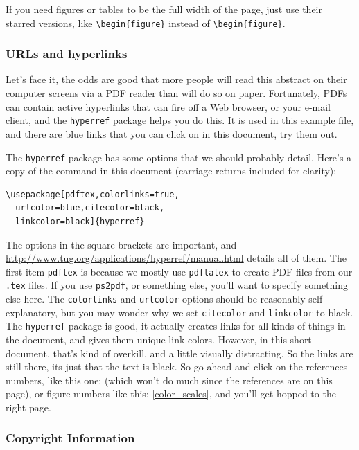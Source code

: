 \documentclass[twoside]{article}
\begin{document}
If you need figures or tables to be the full width of the page,
just use their starred versions, like \verb=\begin{figure}= instead
of \verb=\begin{figure}=.

\subsubsection*{URLs and hyperlinks}

Let's face it, the odds are good that more people will read this
abstract on their computer screens via a PDF reader than will do
so on paper.  Fortunately, PDFs can contain active hyperlinks that
can fire off a Web browser, or your e-mail client, and the
\verb=hyperref= package helps you do this.  It is used in this
example file, and there are blue links that you can click on in
this document, try them out.

The \verb=hyperref= package has some options that we should probably 
detail.  Here's a copy of the command in this document (carriage returns 
included for clarity):

\begin{verbatim}
\usepackage[pdftex,colorlinks=true,
  urlcolor=blue,citecolor=black,
  linkcolor=black]{hyperref}
\end{verbatim}
\noindent
The options in the square brackets are important, and
\url{http://www.tug.org/applications/hyperref/manual.html} details
all of them.  The first item \verb=pdftex= is because we mostly use
\verb=pdflatex= to create PDF files from our \verb=.tex= files.  If
you use \verb=ps2pdf=, or something else, you'll want to specify
something else here.  The \verb=colorlinks= and \verb=urlcolor=
options should be reasonably self-explanatory, but you may wonder
why we set \verb=citecolor= and \verb=linkcolor= to black.  The
\verb=hyperref= package is good, it actually creates links for all
kinds of things in the document, and gives them unique link colors.
However, in this short document, that's kind of overkill, and a
little visually distracting.  So the links are still there, its
just that the text is black.  So go ahead and click on the references
numbers, like this one: \citep{latexguide} (which won't do much since
the references are on this page), or figure numbers like
this: \ref{color_scales}, and you'll get hopped to the right page.


\subsubsection*{Copyright Information}
\end{document}

